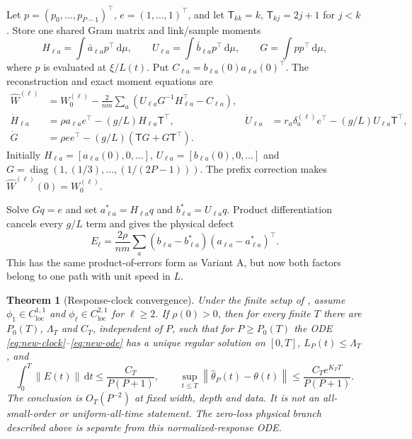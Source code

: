 \documentclass[11pt]{article}
\newtheorem{theorem}{Theorem}[section]
\theoremstyle{definition}
\theoremstyle{remark}
\newcommand{\norm}[1]{\left\lVert #1\right\rVert}
\newcommand{\dd}{\,\mathrm{d}}
\newcommand{\diag}{\operatorname{diag}}
\begin{document}
Let $p=(p_0,\ldots,p_{P-1})^\top$, $e=(1,\ldots,1)^\top$, and let
$\mathsf T_{kk}=k$, $\mathsf T_{kj}=2j+1$ for $j<k$.  Store one shared Gram
matrix and link/sample moments
\[
 H_{\ell a}=\int\bar a_{\ell a}p^\top\dd\mu,\qquad
 U_{\ell a}=\int\bar b_{\ell a}p^\top\dd\mu,\qquad
 G=\int pp^\top\dd\mu,
\]
where $p$ is evaluated at $\xi/L(t)$.  Put
$C_{\ell a}=b_{\ell a}(0)a_{\ell a}(0)^\top$.  The reconstruction and exact
moment equations are
\begin{align}
 \widehat W^{(\ell)}&=W_0^{(\ell)}-\frac{2}{nm}\sum_a
 (U_{\ell a}G^{-1}H_{\ell a}^\top-C_{\ell a}),       \label{eq:new-recon}\\
 \dot H_{\ell a}&=\rho a_{\ell a}e^\top-(g/L)H_{\ell a}\mathsf T^\top,
 &\dot U_{\ell a}&=r_a\delta_a^{(\ell)}e^\top-(g/L)U_{\ell a}\mathsf T^\top,
 \nonumber\\
 \dot G&=\rho ee^\top-(g/L)(\mathsf TG+G\mathsf T^\top). \label{eq:new-ode}
\end{align}
Initially $H_{\ell a}=[a_{\ell a}(0),0,\ldots]$,
$U_{\ell a}=[b_{\ell a}(0),0,\ldots]$ and
$G=\diag(1,(1/3),\ldots,(1/(2P-1)))$.  The prefix correction makes
$\widehat W^{(\ell)}(0)=W_0^{(\ell)}$.

Solve $Gq=e$ and set $a^*_{\ell a}=H_{\ell a}q$ and
$b^*_{\ell a}=U_{\ell a}q$.  Product differentiation cancels every $g/L$
term and gives the physical defect
\begin{equation}
 E_\ell=\frac{2\rho}{nm}\sum_a
 (b_{\ell a}-b^*_{\ell a})(a_{\ell a}-a^*_{\ell a})^\top. \label{eq:new-defect}
\end{equation}
This has the same product-of-errors form as Variant A, but now both factors
belong to one path with unit speed in $L$.

\begin{theorem}[Response-clock convergence]
\label{thm:new}
Under the finite setup of , assume
$\phi_1\in C^{1,1}_{\mathrm{loc}}$ and
$\phi_\ell\in C^{2,1}_{\mathrm{loc}}$ for $\ell\ge2$.  If $\rho(0)>0$, then
for every finite $T$ there are $P_0(T)$, $\Lambda_T$ and $C_T$, independent
of $P$, such that for $P\ge P_0(T)$ the ODE
\eqref{eq:new-clock}--\eqref{eq:new-ode} has a unique regular solution on
$[0,T]$, $L_P(t)\le\Lambda_T$, and
\begin{equation}
 \int_0^T\norm{E(t)}\dd t\le\frac{C_T}{P(P+1)},\qquad
 \sup_{t\le T}\norm{\widehat\theta_P(t)-\theta(t)}
 \le\frac{C_Te^{K_TT}}{P(P+1)}.                      \label{eq:new-rate}
\end{equation}
The conclusion is $O_T(P^{-2})$ at fixed width, depth and data.  It is not an
all-small-order or uniform-all-time statement.  The zero-loss physical branch
described above is separate from this normalized-response ODE.
\end{theorem}
\end{document}
